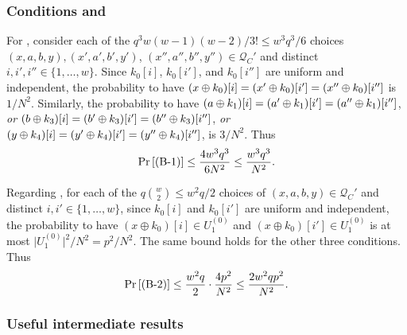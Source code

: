 \documentclass[journal=tosc,final,nohyperref]{iacrtrans}
\begin{document}
%
%
%
\subsubsection{Conditions \bone and \btwo}

For \bone, consider each of the $q^3w(w-1)(w-2)/3!\leq w^3q^3/6$ choices $(x,a,b,y),(x',a',b',y')$, $(x'',a'',b'',y'')\in \mathcal{Q}_{C}'$ and distinct $i, i', i'' \in \{1, \ldots, w\}$. Since $k_0[i]$, $k_0[i']$, and $k_0[i'']$ are uniform and independent, the probability to have $(x\oplus k_0)[i]=(x'\oplus k_0)[i']=(x''\oplus k_0)[i'']$ is $1/N^2$. Similarly, the probability to have $(a\oplus k_1)[i]=(a'\oplus k_1)[i']=(a''\oplus k_1)[i'']$, {\it or} $(b\oplus k_3)[i]=(b'\oplus k_3)[i']=(b''\oplus k_3)[i'']$, {\it or} $(y\oplus k_4)[i]=(y'\oplus k_4)[i']=(y''\oplus k_4)[i'']$, is $3/N^2$. Thus
%
$$
\operatorname{Pr}\left[\text{(B-1)}\right] \leq \frac{4w^3q^3}{6N^2}\leq \frac{w^3q^3}{N^2}.
$$
%




%

Regarding \btwo, for each of the $q{w\choose 2}\leq w^2q/2$ choices of $(x,a,b, y) \in \mathcal{Q}_{C}'$ and distinct $i, i' \in \{1, \ldots, w\}$, since $k_0[i]$ and $k_0[i']$ are uniform and independent, the probability to have $(x \oplus k_{0})[i]\in U_1^{(0)}$ and $(x \oplus k_0)[i']\in U_1^{(0)}$ is at most $\big|U_1^{(0)}\big|^2/N^2=p^2/N^2$. The same bound holds for the other three conditions. Thus
%
$$
\operatorname{Pr}\left[\text{(B-2)}\right] \leq \frac{w^{2} q}{2}\cdot\frac{4p^2}{N^2}\leq\frac{2w^{2} q p^2}{N^{2}}.
$$
%



%




\subsubsection{Useful intermediate results}
\end{document}

